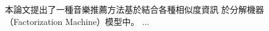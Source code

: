 \begin{abstractCH}

\setlength{\baselineskip}{1.5em}
本論文提出了一種音樂推薦方法基於結合各種相似度資訊%
於分解機器（Factorization Machine）模型中。%
...%
\end{abstractCH}
